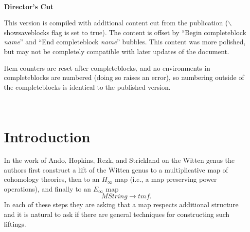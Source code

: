 \documentclass[leqno,oneside,english]{elsarticle}
\newcounter{enumisaved}
\newlength{\thmsaved}
\newlength{\thmnow}
\begin{document}
\maketitle
\tableofcontents

{{    {}  \ifshowcomplete
  \ 
  {
  \textbf{Director's Cut}

  This version is compiled with additional content cut from the
  publication ($\backslash$showsaveblocks flag is set to true).  The content is offset by ``Begin
  completeblock \emph{name}'' and ``End completeblock \emph{name}''
  bubbles.  This content was more polished, but may not be completely
  compatible with later updates of the document.

  Item counters are reset after completeblocks, and no environments in
  completeblocks are numbered (doing so raises an error), so numbering
  outside of the completeblocks is identical to the published
  version.  

}
  {}
  \ 
  \ifthenelse{\lengthtest{\thmnow > \thmsaved}}{
    
    \setcounter{thm}{{\strip@pt{\thmsaved}}}  
  }{
    
  }
  \setcounter{enumi}{\theenumisaved}
    \else  \fi
}}{}
{{\ifshowsaveblocks
{}
\fi}}{}

\nocite{Bor94,Bor94a}
\section{Introduction}

In the work of Ando, Hopkins, Rezk, and Strickland on the Witten genus
\cite{AHS01,AHS04,AHR06} the authors first construct a lift of the
Witten genus to a multiplicative map of cohomology theories, then to
an $H_\infty$ map (i.e., a map preserving power operations), and
finally to an $E_\infty$ map
\[
  M\mathit{String}\rightarrow \mathit{tmf}.
\]
In each of these steps they are asking that a map respects additional
structure and it is natural to ask if there are general techniques for
constructing such liftings.
\end{document}

